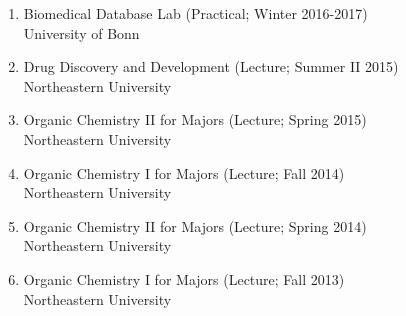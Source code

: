 \documentclass[10pt,a4paper,sans]{moderncv} %
\begin{document}
\begin{enumerate}
        \item     Biomedical Database Lab (Practical; Winter 2016-2017)\\
    {\scriptsize University of Bonn}

        \item     Drug Discovery and Development (Lecture; Summer II 2015)\\
    {\scriptsize Northeastern University}

        \item     Organic Chemistry II for Majors (Lecture; Spring 2015)\\
    {\scriptsize Northeastern University}

        \item     Organic Chemistry I for Majors (Lecture; Fall 2014)\\
    {\scriptsize Northeastern University}

        \item     Organic Chemistry II for Majors (Lecture; Spring 2014)\\
    {\scriptsize Northeastern University}

        \item     Organic Chemistry I for Majors (Lecture; Fall 2013)\\
    {\scriptsize Northeastern University}

    \end{enumerate}
\end{document}

